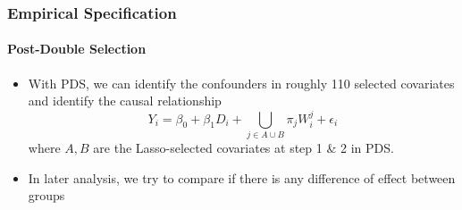 \documentclass{beamer}
\begin{document}
\begin{frame} %
\frametitle{Empirical Specification}
\framesubtitle{Post-Double Selection}
\begin{itemize}
    \item With PDS, we can identify the confounders in roughly 110 selected covariates and identify the causal relationship
    \[
        Y_i = \beta_0 + \beta_1 D_i + \bigcup_{j \in A \cup B} \pi_j W_i^j + \epsilon_i
    \]
    where $A,B$ are the Lasso-selected covariates at step 1 \& 2 in PDS.
    \item In later analysis, we try to compare if there is any difference of effect between groups
\end{itemize}
\end{frame}
    
\end{document}
